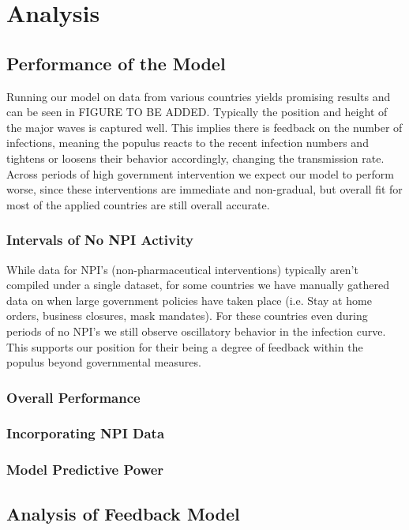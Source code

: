 \documentclass[letterpaper, 10 pt, conference]{ieeeconf}  %
\begin{document}
\section{Analysis}

\subsection{Performance of the Model}

Running our model on data from various countries yields promising results and can be seen in FIGURE TO BE ADDED. Typically the position and height of the major waves is captured well. This implies there is feedback on the number of infections, meaning the populus reacts to the recent infection numbers and tightens or loosens their behavior accordingly, changing the transmission rate. Across periods of high government intervention we expect our model to perform worse, since these interventions are immediate and non-gradual, but overall fit for most of the applied countries are still overall accurate.

\subsubsection{Intervals of No NPI Activity}

While  data for NPI's (non-pharmaceutical interventions) typically aren't compiled under a single dataset, for some countries we have manually gathered data on when large government policies have taken place (i.e. Stay at home orders, business closures, mask mandates). For these countries even during periods of no NPI's we still observe oscillatory behavior in the infection curve. This supports our position for their being a degree of feedback within the populus beyond governmental measures. 

\subsubsection{Overall Performance}
\subsubsection{Incorporating NPI Data}
\subsubsection{Model Predictive Power}

\subsection{Analysis of Feedback Model}
\end{document}
